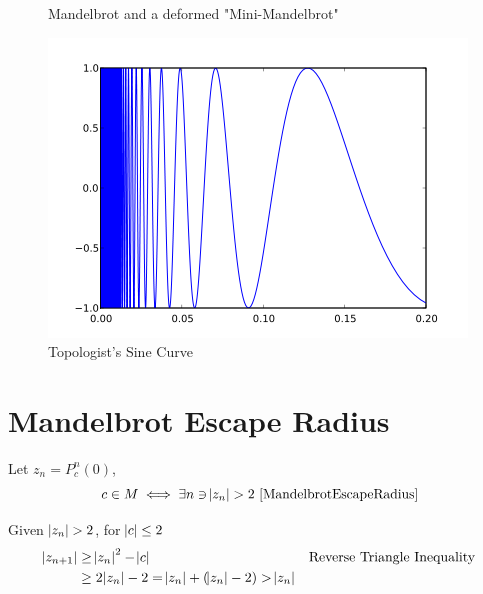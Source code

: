 \documentclass{article}
\begin{document}
\begin{figure}[!htbp]
    \centering
    \caption{Mandelbrot \cite{NormalMandelbrot} and a deformed "Mini-Mandelbrot" \cite{MiniMandelbrot}} %
    \label{fig:MandelbrotSet}%
\end{figure}%

\begin{figure}[!htbp]
    \centering
    \includegraphics[width=.4\linewidth]{images/420px-Topologist_sine_curve.png}
    \caption{Topologist's Sine Curve \cite{TopSineCurve}}%
\end{figure}



\section{Mandelbrot Escape Radius}

Let $z_n = P_c^n(0)$,
\[ c \in M \iff \exists n \ni \abs{z_n} > 2\ \text{\cite{MandelbrotEscapeRadius}}\]

Given $\abs{z_n} > 2$, for $\abs{c} \leq 2$
\begin{align*}
    \abs{z_{n+1}} &\geq \abs{z_n}^2 - \abs{c} &&\text{Reverse Triangle Inequality} \\
    &\geq 2\abs{z_n} - 2 = \abs{z_n} + (\abs{z_n} - 2) > \abs{z_n}
\end{align*}
\end{document}
